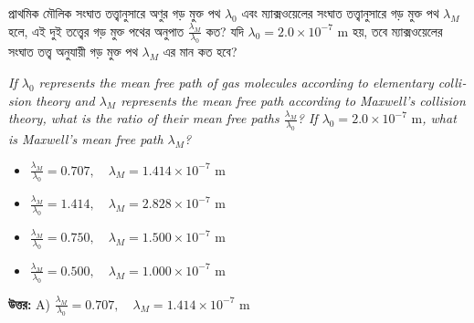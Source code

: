 \documentclass[12pt, a4paper]{article}
\begin{document}
\begin{tcolorbox}[questionbox={প্রশ্ন (Question) 22}]
    \noindent
    প্রাথমিক মৌলিক সংঘাত তত্ত্বানুসারে অণুর গড় মুক্ত পথ $\lambda_0$ এবং ম্যাক্সওয়েলের সংঘাত তত্ত্বানুসারে গড় মুক্ত পথ $\lambda_M$ হলে, এই দুই তত্ত্বের গড় মুক্ত পথের অনুপাত $\frac{\lambda_M}{\lambda_0}$ কত? যদি $\lambda_0 = 2.0 \times 10^{-7}\text{ m}$ হয়, তবে ম্যাক্সওয়েলের সংঘাত তত্ত্ব অনুযায়ী গড় মুক্ত পথ $\lambda_M$ এর মান কত হবে?
    
    \vspace{0.8em}
    \begin{english}
    \noindent\textit{\color{darkgray}
    If $\lambda_0$ represents the mean free path of gas molecules according to elementary collision theory and $\lambda_M$ represents the mean free path according to Maxwell's collision theory, what is the ratio of their mean free paths $\frac{\lambda_M}{\lambda_0}$? If $\lambda_0 = 2.0 \times 10^{-7}\text{ m}$, what is Maxwell's mean free path $\lambda_M$?
    }
    \end{english}
\end{tcolorbox}

\begin{itemize}[label={}, leftmargin=1cm, itemsep=0.5em]
    \item[\textbf{A)}] $\frac{\lambda_M}{\lambda_0} = 0.707, \quad \lambda_M = 1.414 \times 10^{-7}\text{ m}$
    \item[\textbf{B)}] $\frac{\lambda_M}{\lambda_0} = 1.414, \quad \lambda_M = 2.828 \times 10^{-7}\text{ m}$
    \item[\textbf{C)}] $\frac{\lambda_M}{\lambda_0} = 0.750, \quad \lambda_M = 1.500 \times 10^{-7}\text{ m}$
    \item[\textbf{D)}] $\frac{\lambda_M}{\lambda_0} = 0.500, \quad \lambda_M = 1.000 \times 10^{-7}\text{ m}$
\end{itemize}

\vspace{0.5em}
\begin{tcolorbox}[answerbox]
    \textbf{\color{success} উত্তর:} A) $\frac{\lambda_M}{\lambda_0} = 0.707, \quad \lambda_M = 1.414 \times 10^{-7}\text{ m}$
\end{tcolorbox}
\vspace{1em}
\end{document}
